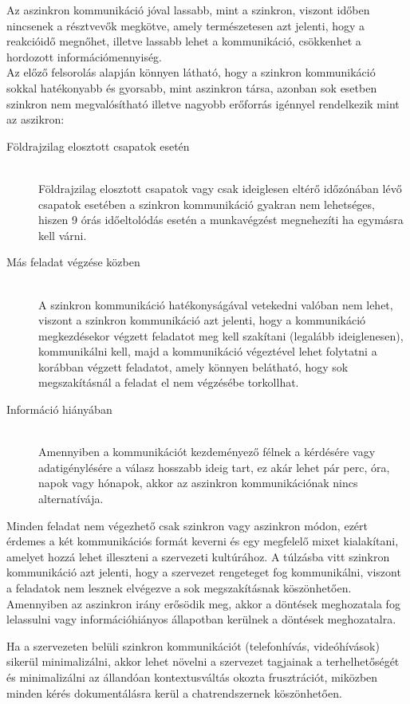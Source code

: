 Az aszinkron kommunikáció jóval lassabb, mint a szinkron, viszont időben nincsenek a résztvevők megkötve, amely természetesen azt jelenti, hogy a reakcióidő megnőhet, illetve lassabb lehet a kommunikáció, csökkenhet a hordozott információmennyiség.\\
\newline
Az előző felsorolás alapján könnyen látható, hogy a szinkron kommunikáció sokkal hatékonyabb és gyorsabb, mint aszinkron társa, azonban sok esetben szinkron nem megvalósítható illetve nagyobb erőforrás igénnyel rendelkezik mint az aszikron:

\begin{description}
  \item [Földrajzilag elosztott csapatok esetén] \hfill\\
  Földrajzilag elosztott csapatok vagy csak ideiglesen eltérő időzónában lévő csapatok esetében a szinkron kommunikáció gyakran nem lehetséges, hiszen 9 órás időeltolódás esetén a munkavégzést megnehezíti ha egymásra kell várni.
  \item [Más feladat végzése közben] \hfill\\
  A szinkron kommunikáció hatékonyságával vetekedni valóban nem lehet, viszont a szinkron kommunikáció azt jelenti, hogy a kommunikáció megkezdésekor végzett feladatot meg kell szakítani (legalább ideiglenesen), kommunikálni kell, majd a kommunikáció végeztével lehet folytatni a korábban végzett feladatot, amely könnyen belátható, hogy sok megszakításnál a feladat el nem végzésébe torkollhat.
  \item [Információ hiányában] \hfill\\
  Amennyiben a kommunikációt kezdeményező félnek a kérdésére vagy adatigénylésére a válasz hosszabb ideig tart, ez akár lehet pár perc, óra, napok vagy hónapok, akkor az aszinkron kommunikációnak nincs alternatívája. 
\end{description}

Minden feladat nem végezhető csak szinkron vagy aszinkron módon, ezért érdemes a két kommunikációs formát keverni és egy megfelelő mixet kialakítani, amelyet hozzá lehet illeszteni a szervezeti kultúrához. A túlzásba vitt szinkron kommunikáció azt jelenti, hogy a szervezet rengeteget fog kommunikálni, viszont a feladatok nem lesznek elvégezve a sok megszakításnak köszönhetően. Amennyiben az aszinkron irány erősödik meg, akkor a döntések meghozatala fog lelassulni vagy információhiányos állapotban kerülnek a döntések meghozatalra.

Ha a szervezeten belüli szinkron kommunikációt (telefonhívás, videóhívások) sikerül minimalizálni, akkor lehet növelni a szervezet tagjainak a terhelhetőségét és minimalizálni az állandóan kontextusváltás okozta frusztrációt, miközben minden kérés dokumentálásra kerül a chatrendszernek köszönhetően.

